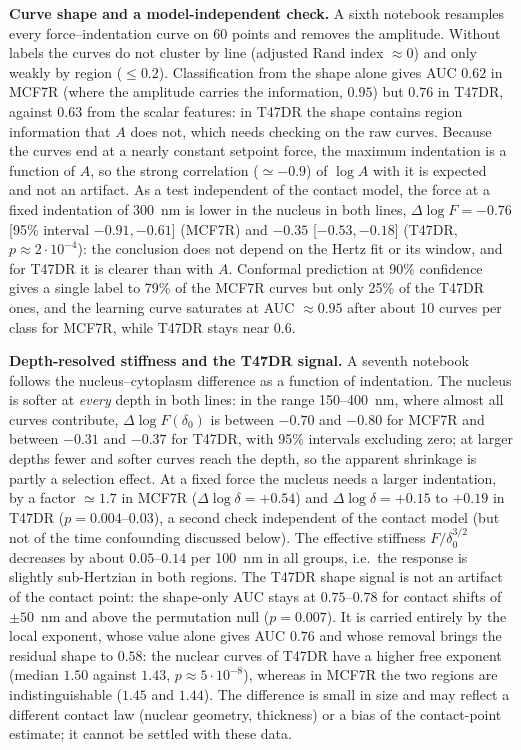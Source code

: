 \documentclass[reprint,nofootinbib,amsmath,amssymb,aps,floatfix]{revtex4-2}
\begin{document}
\textbf{Curve shape and a model-independent check.} A sixth notebook resamples every force--indentation curve on 60 points and removes the amplitude. Without labels the curves do not cluster by line (adjusted Rand index $\approx0$) and only weakly by region ($\le0.2$). Classification from the shape alone gives AUC $0.62$ in MCF7R (where the amplitude carries the information, $0.95$) but $0.76$ in T47DR, against $0.63$ from the scalar features: in T47DR the shape contains region information that $A$ does not, which needs checking on the raw curves. Because the curves end at a nearly constant setpoint force, the maximum indentation is a function of $A$, so the strong correlation ($\simeq-0.9$) of $\log A$ with it is expected and not an artifact. As a test independent of the contact model, the force at a fixed indentation of 300~nm is lower in the nucleus in both lines, $\Delta\log F=-0.76$ [95\% interval $-0.91,-0.61$] (MCF7R) and $-0.35$ [$-0.53,-0.18$] (T47DR, $p\approx2\cdot10^{-4}$): the conclusion does not depend on the Hertz fit or its window, and for T47DR it is clearer than with $A$. Conformal prediction at 90\% confidence gives a single label to 79\% of the MCF7R curves but only 25\% of the T47DR ones, and the learning curve saturates at AUC $\approx0.95$ after about 10 curves per class for MCF7R, while T47DR stays near $0.6$.

\textbf{Depth-resolved stiffness and the T47DR signal.} A seventh notebook follows the nucleus--cytoplasm difference as a function of indentation. The nucleus is softer at \emph{every} depth in both lines: in the range 150--400~nm, where almost all curves contribute, $\Delta\log F(\delta_0)$ is between $-0.70$ and $-0.80$ for MCF7R and between $-0.31$ and $-0.37$ for T47DR, with 95\% intervals excluding zero; at larger depths fewer and softer curves reach the depth, so the apparent shrinkage is partly a selection effect. At a fixed force the nucleus needs a larger indentation, by a factor $\simeq1.7$ in MCF7R ($\Delta\log\delta=+0.54$) and $\Delta\log\delta=+0.15$ to $+0.19$ in T47DR ($p=0.004$--$0.03$), a second check independent of the contact model (but not of the time confounding discussed below). The effective stiffness $F/\delta_0^{3/2}$ decreases by about $0.05$--$0.14$ per 100~nm in all groups, i.e.\ the response is slightly sub-Hertzian in both regions. The T47DR shape signal is not an artifact of the contact point: the shape-only AUC stays at $0.75$--$0.78$ for contact shifts of $\pm50$~nm and above the permutation null ($p=0.007$). It is carried entirely by the local exponent, whose value alone gives AUC $0.76$ and whose removal brings the residual shape to $0.58$: the nuclear curves of T47DR have a higher free exponent (median $1.50$ against $1.43$, $p\approx5\cdot10^{-8}$), whereas in MCF7R the two regions are indistinguishable ($1.45$ and $1.44$). The difference is small in size and may reflect a different contact law (nuclear geometry, thickness) or a bias of the contact-point estimate; it cannot be settled with these data.
\end{document}

